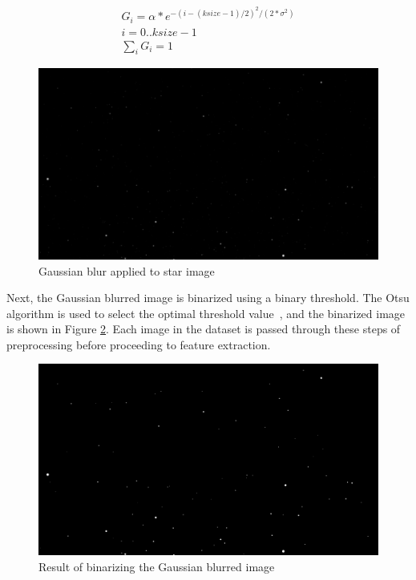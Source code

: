 \documentclass[10pt,twocolumn,letterpaper]{article}
\begin{document}
\begin{equation}
\begin{split}
  G_i = \alpha * e^{-(i-(ksize-1)/2)^2/(2*\sigma ^2)} \\
  i = 0..ksize-1\\
  \sum_i G_i = 1
  \label{eq:gauss}
\end{split}
\end{equation}

\begin{figure}[H]
  \centering
   \includegraphics[width=0.9\linewidth]{gauss}
   \caption{Gaussian blur applied to star image}
   \label{fig:star_gauss}
\end{figure}

Next, the Gaussian blurred image is binarized using a binary threshold. The Otsu algorithm is used to select the optimal threshold value~\cite{opencv}, and the binarized image is shown in Figure \ref{fig:star_binary}. Each image in the dataset is passed through these steps of preprocessing before proceeding to feature extraction.

\begin{figure}[H]
  \centering
   \includegraphics[width=0.9\linewidth]{binary}
   \caption{Result of binarizing the Gaussian blurred image}
   \label{fig:star_binary}
\end{figure}
\end{document}
